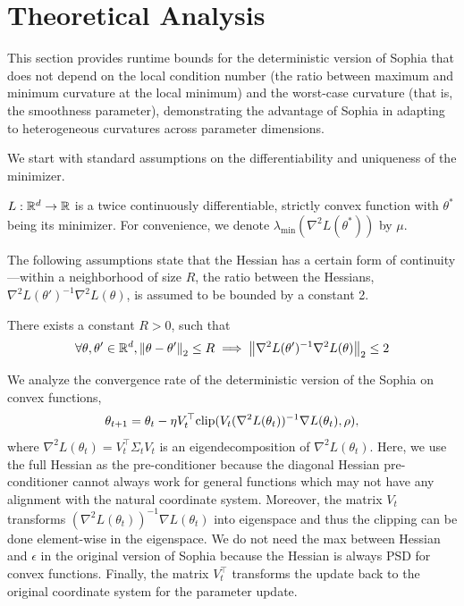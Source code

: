 \section{Theoretical Analysis}\label{sec:theoretical_analysis}


\newcommand{\sub}[1]{_{[#1]}}

This section provides runtime bounds for the deterministic version of Sophia that does not depend on the local condition number (the ratio between maximum and minimum curvature at the local minimum) and the worst-case curvature (that is, the smoothness parameter), demonstrating the advantage of Sophia in adapting to heterogeneous curvatures across parameter dimensions.   

We start with standard assumptions on the differentiability and uniqueness of the minimizer.
\begin{assumption}\label{assum:existence_local_minimizer_w_hessian_pd}
$L:\mathbb{R}^d\to\mathbb{R}$ is a twice continuously differentiable, strictly convex function with $\theta^*$ being its minimizer. For convenience, we denote $\lambda_{\min}(\nabla^2 L(\theta^*))$ by $\mu$.
\end{assumption}
The following assumptions state that the Hessian has a certain form of continuity---within a neighborhood of size $R$, the ratio between the Hessians, $\nabla^2 L(\theta')^{-1} \nabla^2 L(\theta)$, is assumed to be bounded by a constant 2. 
\begin{assumption}\label{assum:hessian_multiplicative_lipschitz}
	There exists a constant $R>0$, such that 
	\begin{align}
		\forall \theta,\theta'\in \mathbb{R}^d, \left\|\theta-\theta'\right\|_2\le R \implies \left\|\nabla^2 L(\theta')^{-1} \nabla^2 L(\theta)\right\|_2\le 2
	\end{align}
\end{assumption}

We analyze the convergence rate of the deterministic version of the Sophia on convex functions,  
\begin{align}\label{eq:clipped_newton_for_convex_loss}
	\theta_{t+1} = \theta_t - \eta V_t^\top\textup{clip}(V_t(\nabla^2L(\theta_t))^{-1}\nabla L(\theta_t),\rho),
\end{align}
where $\nabla^2 L(\theta_t) = V_t^\top \Sigma_t V_t$ is an eigendecomposition of $\nabla^2 L(\theta_t)$. Here, we use the full Hessian as the pre-conditioner because the diagonal Hessian pre-conditioner cannot always work for general functions which may not have any alignment with the natural coordinate system. Moreover, the  matrix $V_t$ transforms $(\nabla^2L(\theta_t))^{-1}\nabla L(\theta_t)$ into eigenspace and thus the clipping can be done element-wise in the eigenspace. We do not need the max between Hessian and $\epsilon$ in the original version of Sophia because the Hessian is always PSD for convex functions. Finally, the matrix $V_t^\top$ transforms the update back to the original coordinate system for the parameter update. 

